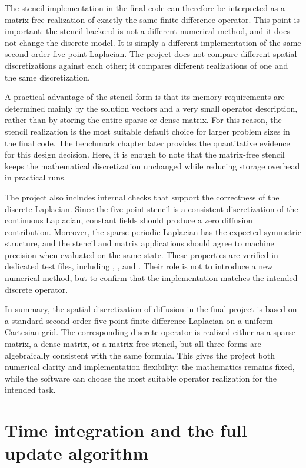 The stencil implementation in the final code can therefore be interpreted as a matrix-free realization of exactly the same finite-difference operator. This point is important: the stencil backend is not a different numerical method, and it does not change the discrete model. It is simply a different implementation of the same second-order five-point Laplacian. The project does not compare different spatial discretizations against each other; it compares different realizations of one and the same discretization.

A practical advantage of the stencil form is that its memory requirements are determined mainly by the solution vectors and a very small operator description, rather than by storing the entire sparse or dense matrix. For this reason, the stencil realization is the most suitable default choice for larger problem sizes in the final code. The benchmark chapter later provides the quantitative evidence for this design decision. Here, it is enough to note that the matrix-free stencil keeps the mathematical discretization unchanged while reducing storage overhead in practical runs.

The project also includes internal checks that support the correctness of the discrete Laplacian. Since the five-point stencil is a consistent discretization of the continuous Laplacian, constant fields should produce a zero diffusion contribution. Moreover, the sparse periodic Laplacian has the expected symmetric structure, and the stencil and matrix applications should agree to machine precision when evaluated on the same state. These properties are verified in dedicated test files, including , , and . Their role is not to introduce a new numerical method, but to confirm that the implementation matches the intended discrete operator.

In summary, the spatial discretization of diffusion in the final project is based on a standard second-order five-point finite-difference Laplacian on a uniform Cartesian grid. The corresponding discrete operator is realized either as a sparse matrix, a dense matrix, or a matrix-free stencil, but all three forms are algebraically consistent with the same formula. This gives the project both numerical clarity and implementation flexibility: the mathematics remains fixed, while the software can choose the most suitable operator realization for the intended task.

\section{Time integration and the full update algorithm}
\label{sec:numimpl_time_update}

